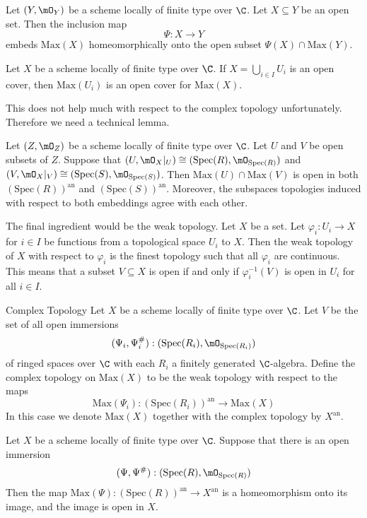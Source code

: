 \documentclass[a4paper]{article}
\begin{document}
\begin{lmm}{}{} Let $(Y,\mO_Y)$ be a scheme locally of finite type over $\C$. Let $X\subseteq Y$ be an open set. Then the inclusion map $$\Psi:X\to Y$$ embeds $\text{Max}(X)$ homeomorphically onto the open subset $\Psi(X)\cap\text{Max}(Y)$. 
\end{lmm}

\begin{crl}{}{} Let $X$ be a scheme locally of finite type over $\C$. If $X=\bigcup_{i\in I}U_i$ is an open cover, then $\text{Max}(U_i)$ is an open cover for $\text{Max}(X)$. 
\end{crl}

This does not help much with respect to the complex topology unfortunately. Therefore we need a technical lemma. 

\begin{lmm}{}{} Let $(Z,\mO_Z)$ be a scheme locally of finite type over $\C$. Let $U$ and $V$ be open subsets of $Z$. Suppose that $(U,\mO_X|_U)\cong(\text{Spec}(R),\mO_{\text{Spec}(R)})$ and $(V,\mO_X|_V)\cong(\text{Spec}(S),\mO_{\text{Spec}(S)})$. Then $\text{Max}(U)\cap\text{Max}(V)$ is open in both $(\text{Spec}(R))^\text{an}$ and $(\text{Spec}(S))^\text{an}$. Moreover, the subspaces topologies induced with respect to both embeddings agree with each other. 
\end{lmm}

The final ingredient would be the weak topology. Let $X$ be a set. Let $\varphi_i:U_i\to X$ for $i\in I$ be functions from a topological space $U_i$ to $X$. Then the weak topology of $X$ with respect to $\varphi_i$ is the finest topology such that all $\varphi_i$ are continuous. This means that a subset $V\subseteq X$ is open if and only if $\varphi_i^{-1}(V)$ is open in $U_i$ for all $i\in I$. 

\begin{defn}{Complex Topology}{} Let $X$ be a scheme locally of finite type over $\C$. Let $V$ be the set of all open immersions $$(\Psi_i,\Psi_i^\#):(\text{Spec}(R_i),\mO_{\text{Spec}(R_i)})$$ of ringed spaces over $\C$ with each $R_i$ a finitely generated $\C$-algebra. Define the complex topology on $\text{Max}(X)$ to be the weak topology with respect to the maps $$\text{Max}(\Psi_i):(\text{Spec}(R_i))^\text{an}\to\text{Max}(X)$$ In this case we denote $\text{Max}(X)$ together with the complex topology by $X^\text{an}$. 
\end{defn}

\begin{lmm}{}{} Let $X$ be a scheme locally of finite type over $\C$. Suppose that there is an open immersion $$(\Psi,\Psi^\#):(\text{Spec}(R),\mO_{\text{Spec}(R)})$$ Then the map $\text{Max}(\Psi):(\text{Spec}(R))^\text{an}\to X^\text{an}$ is a homeomorphism onto its image, and the image is open in $X$. 
\end{lmm}
\end{document}
